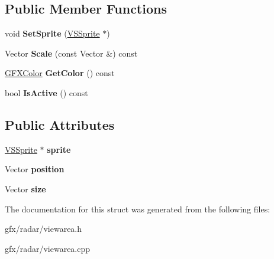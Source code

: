 \subsection*{Public Member Functions}
\begin{DoxyCompactItemize}
\item 
void {\bfseries Set\+Sprite} (\hyperlink{classVSSprite}{V\+S\+Sprite} $\ast$)\hypertarget{structRadar_1_1ViewArea_a6a9c0dafcebadc1f2eccf825ca917315}{}\label{structRadar_1_1ViewArea_a6a9c0dafcebadc1f2eccf825ca917315}

\item 
Vector {\bfseries Scale} (const Vector \&) const \hypertarget{structRadar_1_1ViewArea_a1657115906bd4e707cbda84a05632cc1}{}\label{structRadar_1_1ViewArea_a1657115906bd4e707cbda84a05632cc1}

\item 
\hyperlink{structGFXColor}{G\+F\+X\+Color} {\bfseries Get\+Color} () const \hypertarget{structRadar_1_1ViewArea_a32956fc2633c0f4986277b42a969cb99}{}\label{structRadar_1_1ViewArea_a32956fc2633c0f4986277b42a969cb99}

\item 
bool {\bfseries Is\+Active} () const \hypertarget{structRadar_1_1ViewArea_af427c7bff800d17cd2fa294ddea3b029}{}\label{structRadar_1_1ViewArea_af427c7bff800d17cd2fa294ddea3b029}

\end{DoxyCompactItemize}
\subsection*{Public Attributes}
\begin{DoxyCompactItemize}
\item 
\hyperlink{classVSSprite}{V\+S\+Sprite} $\ast$ {\bfseries sprite}\hypertarget{structRadar_1_1ViewArea_a3f1b43985012e1cb79e4f1cf8e254b9e}{}\label{structRadar_1_1ViewArea_a3f1b43985012e1cb79e4f1cf8e254b9e}

\item 
Vector {\bfseries position}\hypertarget{structRadar_1_1ViewArea_acbdd23443067baad46d8498750117861}{}\label{structRadar_1_1ViewArea_acbdd23443067baad46d8498750117861}

\item 
Vector {\bfseries size}\hypertarget{structRadar_1_1ViewArea_af213caa2e3a50d5b0b67e6a05214c9bb}{}\label{structRadar_1_1ViewArea_af213caa2e3a50d5b0b67e6a05214c9bb}

\end{DoxyCompactItemize}


The documentation for this struct was generated from the following files\+:\begin{DoxyCompactItemize}
\item 
gfx/radar/viewarea.\+h\item 
gfx/radar/viewarea.\+cpp\end{DoxyCompactItemize}
